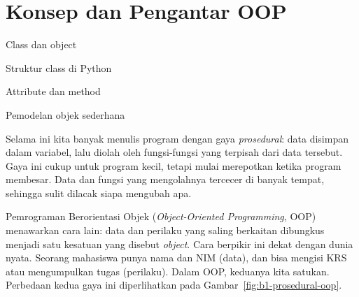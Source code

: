 \chapter{Konsep dan Pengantar OOP}


\begin{dibabini}
  \item Class dan object
  \item Struktur class di Python
  \item Attribute dan method
  \item Pemodelan objek sederhana
\end{dibabini}

Selama ini kita banyak menulis program dengan gaya \emph{prosedural}: data disimpan dalam variabel, lalu diolah oleh fungsi-fungsi yang terpisah dari data tersebut. Gaya ini cukup untuk program kecil, tetapi mulai merepotkan ketika program membesar. Data dan fungsi yang mengolahnya tercecer di banyak tempat, sehingga sulit dilacak siapa mengubah apa.

Pemrograman Berorientasi Objek (\emph{Object-Oriented Programming}, OOP) menawarkan cara lain: data dan perilaku yang saling berkaitan dibungkus menjadi satu kesatuan yang disebut \emph{object}. Cara berpikir ini dekat dengan dunia nyata. Seorang mahasiswa punya nama dan NIM (data), dan bisa mengisi KRS atau mengumpulkan tugas (perilaku). Dalam OOP, keduanya kita satukan. Perbedaan kedua gaya ini diperlihatkan pada Gambar~\ref{fig:b1-prosedural-oop}.

